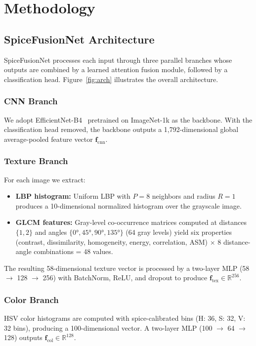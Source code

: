 \documentclass[conference]{IEEEtran}
\begin{document}
\section{Methodology}
\label{sec:method}

\subsection{SpiceFusionNet Architecture}

SpiceFusionNet processes each input through three parallel branches whose outputs
are combined by a learned attention fusion module, followed by a classification
head. Figure~\ref{fig:arch} illustrates the overall architecture.

\subsubsection{CNN Branch}
We adopt EfficientNet-B4~\cite{tan2019efficientnet} pretrained on ImageNet-1k as
the backbone. With the classification head removed, the backbone outputs a
1,792-dimensional global average-pooled feature vector $\mathbf{f}_{\text{cnn}}$.

\subsubsection{Texture Branch}
For each image we extract:
\begin{itemize}
    \item \textbf{LBP histogram:} Uniform LBP with $P=8$ neighbors and radius $R=1$
          produces a 10-dimensional normalized histogram over the grayscale image.
    \item \textbf{GLCM features:} Gray-level co-occurrence matrices computed at
          distances $\{1, 2\}$ and angles $\{0°, 45°, 90°, 135°\}$ (64 gray levels)
          yield six properties (contrast, dissimilarity, homogeneity, energy,
          correlation, ASM) $\times$ 8 distance-angle combinations = 48 values.
\end{itemize}
The resulting 58-dimensional texture vector is processed by a two-layer MLP
(58 $\to$ 128 $\to$ 256) with BatchNorm, ReLU, and dropout to produce
$\mathbf{f}_{\text{tex}} \in \mathbb{R}^{256}$.

\subsubsection{Color Branch}
HSV color histograms are computed with spice-calibrated bins
(H: 36, S: 32, V: 32 bins), producing a 100-dimensional vector. A two-layer MLP
(100 $\to$ 64 $\to$ 128) outputs $\mathbf{f}_{\text{col}} \in \mathbb{R}^{128}$.
\end{document}
